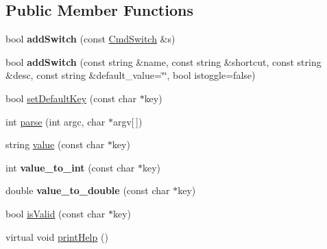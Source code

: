 \subsection*{Public Member Functions}
\begin{DoxyCompactItemize}
\item 
\hypertarget{classps_1_1utils_1_1CmdLineParser_a8167a43fc6b93e49aab170cc7189397d}{}bool {\bfseries add\+Switch} (const \hyperlink{classps_1_1utils_1_1CmdLineParser_1_1CmdSwitch}{Cmd\+Switch} \&s)\label{classps_1_1utils_1_1CmdLineParser_a8167a43fc6b93e49aab170cc7189397d}

\item 
\hypertarget{classps_1_1utils_1_1CmdLineParser_a97a17c25f257570a3d316cd5f5f48f01}{}bool {\bfseries add\+Switch} (const string \&name, const string \&shortcut, const string \&desc, const string \&default\+\_\+value=\char`\"{}\char`\"{}, bool istoggle=false)\label{classps_1_1utils_1_1CmdLineParser_a97a17c25f257570a3d316cd5f5f48f01}

\item 
bool \hyperlink{classps_1_1utils_1_1CmdLineParser_a20bf5b0d5bc797ccad37a08b7cca7a26}{set\+Default\+Key} (const char $\ast$key)
\item 
int \hyperlink{classps_1_1utils_1_1CmdLineParser_a3f665b3b1bde8f417809648d70390845}{parse} (int argc, char $\ast$argv\mbox{[}$\,$\mbox{]})
\item 
string \hyperlink{classps_1_1utils_1_1CmdLineParser_a5c39ac73b9ee3d312bef0f10db488cfb}{value} (const char $\ast$key)
\item 
\hypertarget{classps_1_1utils_1_1CmdLineParser_ae373b5a0d156b2a647c89fb98c68ed56}{}int {\bfseries value\+\_\+to\+\_\+int} (const char $\ast$key)\label{classps_1_1utils_1_1CmdLineParser_ae373b5a0d156b2a647c89fb98c68ed56}

\item 
\hypertarget{classps_1_1utils_1_1CmdLineParser_a925522c8f2711bf58dfca23125e37e9b}{}double {\bfseries value\+\_\+to\+\_\+double} (const char $\ast$key)\label{classps_1_1utils_1_1CmdLineParser_a925522c8f2711bf58dfca23125e37e9b}

\item 
bool \hyperlink{classps_1_1utils_1_1CmdLineParser_a4254b2a2312b6b6335cc8cb44dd185f1}{is\+Valid} (const char $\ast$key)
\item 
virtual void \hyperlink{classps_1_1utils_1_1CmdLineParser_a8619d5088b9532cc530198922f9bd253}{print\+Help} ()
\end{DoxyCompactItemize}

